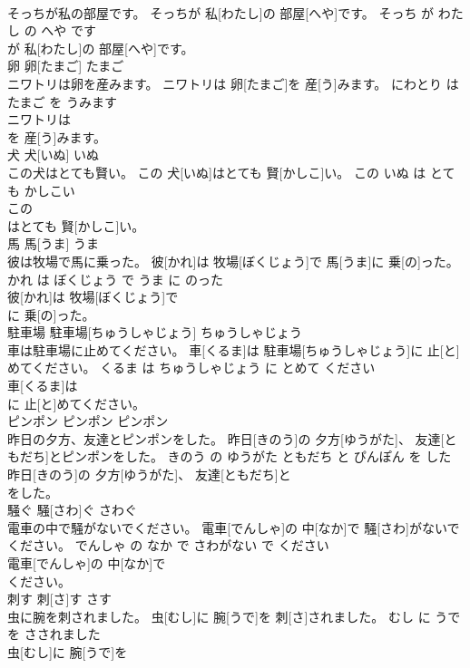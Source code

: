 \documentclass[8pt]{extreport}
\begin{document}
\begin{CJK}{UTF8}{min}
\\	そっちが私の部屋です。	そっちが 私[わたし]の 部屋[へや]です。	そっち が わたし の へや です	
\\	が 私[わたし]の 部屋[へや]です。		
\\	卵	卵[たまご]	たまご	
\\	ニワトリは卵を産みます。	ニワトリは 卵[たまご]を 産[う]みます。	にわとり は たまご を うみます	
\\	ニワトリは
\\	を 産[う]みます。		
\\	犬	犬[いぬ]	いぬ	
\\	この犬はとても賢い。	この 犬[いぬ]はとても 賢[かしこ]い。	この いぬ は とても かしこい	
\\	この
\\	はとても 賢[かしこ]い。		
\\	馬	馬[うま]	うま	
\\	彼は牧場で馬に乗った。	彼[かれ]は 牧場[ぼくじょう]で 馬[うま]に 乗[の]った。	かれ は ぼくじょう で うま に のった	
\\	彼[かれ]は 牧場[ぼくじょう]で
\\	に 乗[の]った。		
\\	駐車場	駐車場[ちゅうしゃじょう]	ちゅうしゃじょう	
\\	車は駐車場に止めてください。	車[くるま]は 駐車場[ちゅうしゃじょう]に 止[と]めてください。	くるま は ちゅうしゃじょう に とめて ください	
\\	車[くるま]は
\\	に 止[と]めてください。		
\\	ピンポン	ピンポン	ピンポン	
\\	昨日の夕方、友達とピンポンをした。	昨日[きのう]の 夕方[ゆうがた]、 友達[ともだち]とピンポンをした。	きのう の ゆうがた ともだち と ぴんぽん を した	
\\	昨日[きのう]の 夕方[ゆうがた]、 友達[ともだち]と
\\	をした。		
\\	騒ぐ	騒[さわ]ぐ	さわぐ	
\\	電車の中で騒がないでください。	電車[でんしゃ]の 中[なか]で 騒[さわ]がないでください。	でんしゃ の なか で さわがない で ください	
\\	電車[でんしゃ]の 中[なか]で
\\	ください。		
\\	刺す	刺[さ]す	さす	
\\	虫に腕を刺されました。	虫[むし]に 腕[うで]を 刺[さ]されました。	むし に うで を さされました	
\\	虫[むし]に 腕[うで]を

\end{CJK}
\end{document}
